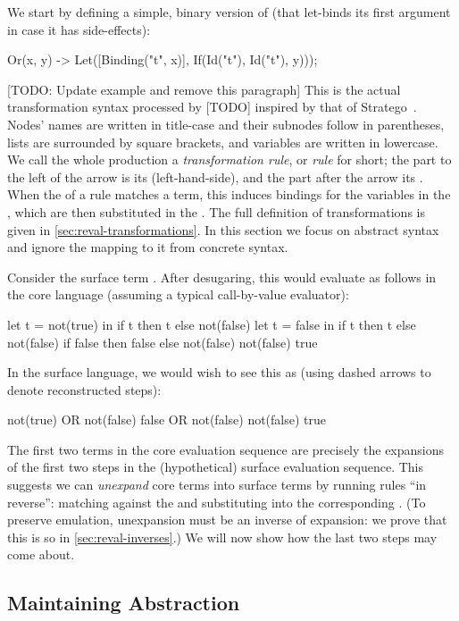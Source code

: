 We start by defining a simple, binary version of  (that
let-binds its first argument in case it has side-effects):
\begin{Codes}
Or(x, y) -> Let([Binding("t", x)],
                If(Id("t"), Id("t"), y)));
\end{Codes}
[TODO: Update example and remove this paragraph]
This is the actual transformation syntax processed by [TODO]
inspired by that of Stratego~\cite{stratego}.
Nodes' names are written in title-case and their subnodes follow in parentheses,
lists are surrounded by square brackets, and variables are written in
lowercase. We call the whole production a \emph{transformation rule}, or
\emph{rule} for short; the
part to the left of the arrow is its
\emph{} (left-hand-side), and the part after the arrow its
\emph{}.
When the  of a rule matches a term, this induces
bindings for the variables in the , which are then substituted
in the . The full definition of transformations is given
in \cref{sec:reval-transformations}.
In this section we focus on abstract syntax and ignore
the mapping to it from concrete syntax.

Consider the surface term . After
desugaring, this would evaluate as follows in the core language
(assuming a typical call-by-value evaluator):
\begin{Codes}
    let t = not(true) in
      if t then t else not(false)
\CoreStep let t = false in
      if t then t else not(false)
\CoreStep if false then false else not(false)
\CoreStep not(false)
\CoreStep true
\end{Codes}
In the surface language, we would wish to see this as (using dashed
arrows to denote reconstructed steps):
\begin{Codes}
    not(true) OR not(false)
\SurfStep false OR not(false)
\SurfStep not(false)
\SurfStep true
\end{Codes}
The first two terms in the core evaluation sequence are precisely the
expansions of the first two steps in the (hypothetical) surface evaluation
sequence. This suggests
we can \emph{unexpand} core terms into surface terms by running rules ``in
reverse'': matching against the  and substituting into the
corresponding .
(To preserve emulation, unexpansion must be an inverse of expansion: we
prove that this is so in \cref{sec:reval-inverses}.)
We will now show how the last two steps
may come about.

\subsection{Maintaining Abstraction}
\label{sec:reval-exposition-tagging}

